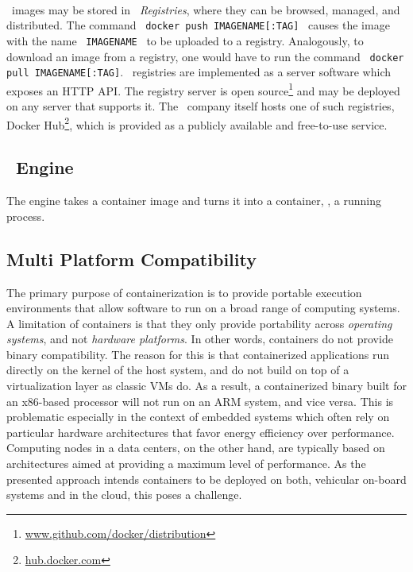 \paragraph{}
\docker\ images may be stored in \emph{\docker\ Registries}, where they can be browsed, managed, and distributed. The command \ \texttt{docker push IMAGENAME[:TAG]} \ causes the image with the name \ \texttt{IMAGENAME} \ to be uploaded to a registry. Analogously, to download an image from a registry, one would have to run the command \ \texttt{docker pull IMAGENAME[:TAG]}. \docker\ registries are implemented as a server software which exposes an HTTP API. The registry server is open source\footnote{\url{www.github.com/docker/distribution}} and may be deployed on any server that supports it. The \docker\ company itself hosts one of such registries, Docker Hub\footnote{\url{hub.docker.com}}, which is provided as a publicly available  and free-to-use service. 

\subsection{\docker\ Engine}
The engine takes a container image and turns it into a container, \ie , a running process.



\subsection{Multi Platform Compatibility} \label{sec:multiplat}
The primary purpose of containerization is to provide portable execution environments that allow software to run on a broad range of computing systems. A limitation of containers is that they only provide portability across \emph{operating systems}, and not \emph{hardware platforms}. In other words, containers do not provide binary compatibility. The reason for this is that containerized applications run directly on the kernel of the host system, and do not build on top of a virtualization layer as classic VMs do. As a result, a containerized binary built for an x86-based processor will not run on an ARM system, and vice versa. This is problematic especially in the context of embedded systems which often rely on particular hardware architectures that favor energy efficiency over performance. Computing nodes in a data centers, on the other hand, are typically based on architectures aimed at providing a maximum level of performance. As the presented approach intends containers to be deployed on both, vehicular on-board systems and in the cloud, this poses a challenge. 

